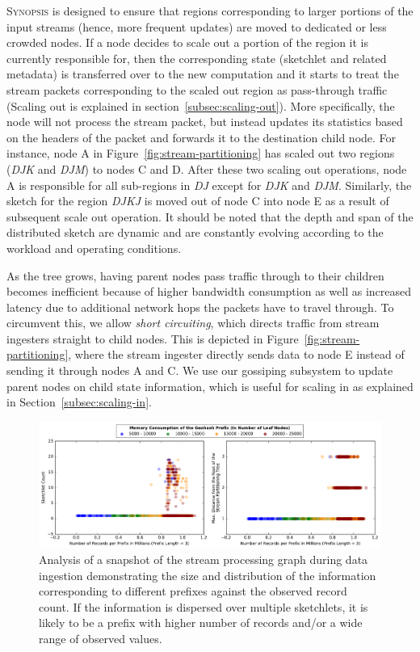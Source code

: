 \textsc{Synopsis} is designed to ensure that regions corresponding to larger portions of the input streams (hence, more frequent updates) are moved to dedicated or less crowded nodes.
If a node decides to scale out a portion of the region it is currently responsible for, then the corresponding state (sketchlet and related metadata) is transferred over to the new computation and it starts to treat the stream packets corresponding to the scaled out region as pass-through traffic (Scaling out is explained in section~\ref{subsec:scaling-out}).
More specifically, the node will not process the stream packet, but instead updates its statistics based on the headers of the packet and forwards it to the destination child node. 
For instance, node A in Figure~\ref{fig:stream-partitioning} has scaled out two regions (\emph{DJK} and \emph{DJM}) to nodes C and D.
After these two scaling out operations, node A is responsible for all sub-regions in \emph{DJ} except for \emph{DJK} and \emph{DJM}.
Similarly, the sketch for the region \emph{DJKJ} is moved out of node C into node E as a result of subsequent scale out operation.
It should be noted that the depth and span of the distributed sketch are dynamic and are constantly evolving according to the workload and operating conditions.

As the tree grows, having parent nodes pass traffic through to their children becomes inefficient because of higher bandwidth consumption as well as increased latency due to additional network hops the packets have to travel through.
To circumvent this, we allow \emph{short circuiting}, which directs traffic from stream ingesters straight to child nodes.
This is depicted in Figure~\ref{fig:stream-partitioning}, where the stream ingester directly sends data to node E instead of sending it through nodes A and C.
We use our gossiping subsystem to update parent nodes on child state information, which is useful for scaling in as explained in Section~\ref{subsec:scaling-in}.
\begin{figure}[t!]
    \centerline{\includegraphics[width=\linewidth]{figures/scaleout_graph_analysis.pdf}}
    \caption{Analysis of a snapshot of the stream processing graph during data ingestion demonstrating the size and distribution of the information corresponding to different prefixes against the observed record count. If the information is dispersed over multiple sketchlets, it is likely to be a prefix with higher number of records and/or a wide range of observed values.}
    \label{fig:scaleout-graph-analysis}
\end{figure}
%

